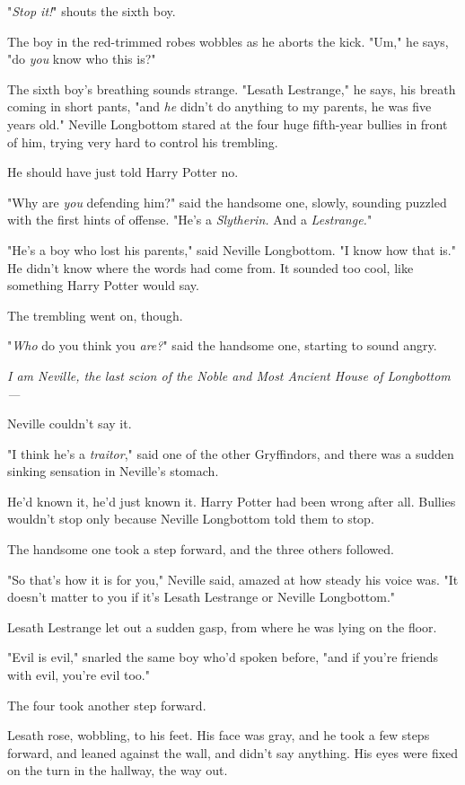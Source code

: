 "\emph{Stop it!}" shouts the sixth boy.

The boy in the red-trimmed robes wobbles as he aborts the kick. "Um," he says, 
"do \emph{you} know who this is?"

The sixth boy's breathing sounds strange. "Lesath Lestrange," he says, his 
breath coming in short pants, "and \emph{he} didn't do anything to my parents, 
he was five years old."
\sbreak
Neville Longbottom stared at the four huge fifth-year bullies in front of him, 
trying very hard to control his trembling.

He should have just told Harry Potter no.

"Why are \emph{you} defending him?" said the handsome one, slowly, sounding 
puzzled with the first hints of offense. "He's a \emph{Slytherin.} And a 
\emph{Lestrange.}"

"He's a boy who lost his parents," said Neville Longbottom. "I know how that 
is." He didn't know where the words had come from. It sounded too cool, like 
something Harry Potter would say.

The trembling went on, though.

"\emph{Who} do you think you \emph{are?}" said the handsome one, starting to 
sound angry.

\emph{I am Neville, the last scion of the Noble and Most Ancient House of 
Longbottom---}

Neville couldn't say it.

"I think he's a \emph{traitor}," said one of the other Gryffindors, and there 
was a sudden sinking sensation in Neville's stomach.

He'd known it, he'd just known it. Harry Potter had been wrong after all. 
Bullies wouldn't stop only because Neville Longbottom told them to stop.

The handsome one took a step forward, and the three others followed.

"So that's how it is for you," Neville said, amazed at how steady his voice 
was. "It doesn't matter to you if it's Lesath Lestrange or Neville Longbottom."

Lesath Lestrange let out a sudden gasp, from where he was lying on the floor.

"Evil is evil," snarled the same boy who'd spoken before, "and if you're 
friends with evil, you're evil too."

The four took another step forward.

Lesath rose, wobbling, to his feet. His face was gray, and he took a few steps 
forward, and leaned against the wall, and didn't say anything. His eyes were 
fixed on the turn in the hallway, the way out.

